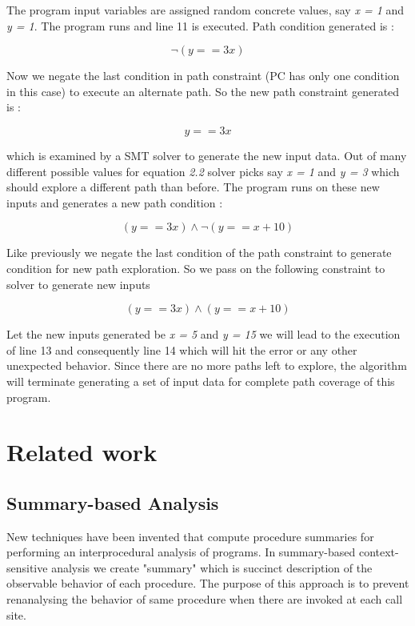 \documentclass[12pt,oneside]{book}
\begin{document}
The program input variables are assigned random concrete values, say \textit{x = 1} and \textit{y = 1}. The program runs and line 11 is executed. Path condition generated is :

\begin{equation}
\neg(y == 3x)
\end{equation}

Now we negate the last condition in path constraint (PC has only one condition in this case) to execute an alternate path. So the new path constraint generated is :

\begin{equation}
y == 3x
\end{equation}

which is examined by a SMT solver to generate the new input data. Out of many different possible values for equation \textit{2.2} solver picks say \textit{x = 1} and \textit{y = 3} which should explore a different path than before. The program runs on these new inputs and generates a new path condition :

\begin{equation}
(y == 3x) \wedge \neg(y == x + 10)
\end{equation}

Like previously we negate the last condition of the path constraint to generate condition for new path exploration.
So we pass on the following constraint to solver to generate new inputs

\begin{equation}
(y == 3x) \wedge (y == x + 10)
\end{equation}

Let the new inputs generated be \textit{x = 5} and \textit{y = 15} we will lead to the execution of line 13 and consequently line 14 which will hit the error or any other unexpected behavior. Since there are no more paths left to explore, the algorithm will terminate generating a set of input data for complete path coverage of this program.


\section {Related work}


\subsection {Summary-based Analysis}
New techniques have been invented that compute procedure summaries for performing an interprocedural analysis of programs. In summary-based context-sensitive analysis we create "summary"\cite{ipa1} which is succinct description of the observable behavior of each procedure. The purpose of this approach is to prevent renanalysing the behavior of same procedure when there are invoked at each call site.
\end{document}
